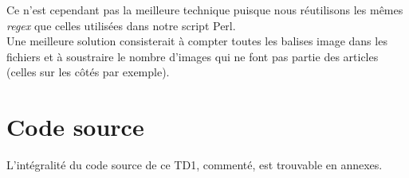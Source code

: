 Ce n'est cependant pas la meilleure technique puisque nous réutilisons les mêmes \textit{regex} que celles utilisées dans notre script Perl.\\
Une meilleure solution consisterait à compter toutes les balises image dans les fichiers et à soustraire le nombre d'images qui ne font pas partie des articles (celles sur les côtés par exemple).

\section{Code source}

L'intégralité du code source de ce TD1, commenté, est trouvable en annexes.
